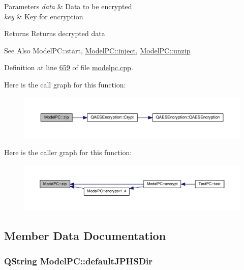 \begin{DoxyParams}{Parameters}
{\em data} & Data to be encrypted \\
\hline
{\em key} & Key for encryption \\
\hline
\end{DoxyParams}
\begin{DoxyReturn}{Returns}
Returns decrypted data 
\end{DoxyReturn}
\begin{DoxySeeAlso}{See Also}
Model\-P\-C\-::start, \hyperlink{class_model_p_c_aada6a04d81ada8f2b4ba18108c8d6f10}{Model\-P\-C\-::inject}, \hyperlink{class_model_p_c_a6da88f166785a49f73b22c169f956fd0}{Model\-P\-C\-::unzip} 
\end{DoxySeeAlso}


Definition at line \hyperlink{modelpc_8cpp_source_l00659}{659} of file \hyperlink{modelpc_8cpp_source}{modelpc.\-cpp}.



Here is the call graph for this function\-:
\nopagebreak
\begin{figure}[H]
\begin{center}
\leavevmode
\includegraphics[width=350pt]{class_model_p_c_afebbbfa4b07deba4f68fc6dfb50f353f_cgraph}
\end{center}
\end{figure}




Here is the caller graph for this function\-:
\nopagebreak
\begin{figure}[H]
\begin{center}
\leavevmode
\includegraphics[width=350pt]{class_model_p_c_afebbbfa4b07deba4f68fc6dfb50f353f_icgraph}
\end{center}
\end{figure}




\subsection{Member Data Documentation}
\hypertarget{class_model_p_c_abd038306f14f22fb885a1697c96d6335}{
\subsubsection[{default\-J\-P\-H\-S\-Dir}]{\setlength{\rightskip}{0pt plus 5cm}Q\-String Model\-P\-C\-::default\-J\-P\-H\-S\-Dir}}\label{class_model_p_c_abd038306f14f22fb885a1697c96d6335}


